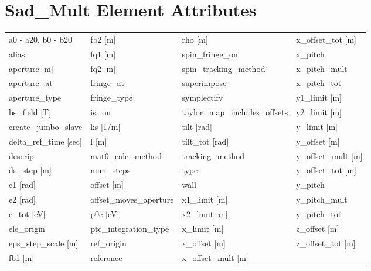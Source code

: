  \section{Sad_Mult Element Attributes}
 \label{s:list.sad.mult}
 
 \begin{tabular}{llll} \toprule
a0 - a20, b0 - b20               & fb2 [m]                          & rho [m]                          & x_offset_tot [m]                 \\
alias                            & fq1 [m]                          & spin_fringe_on                   & x_pitch                          \\
aperture [m]                     & fq2 [m]                          & spin_tracking_method             & x_pitch_mult                     \\
aperture_at                      & fringe_at                        & superimpose                      & x_pitch_tot                      \\
aperture_type                    & fringe_type                      & symplectify                      & y1_limit [m]                     \\
bs_field [T]                     & is_on                            & taylor_map_includes_offsets      & y2_limit [m]                     \\
create_jumbo_slave               & ks [1/m]                         & tilt [rad]                       & y_limit [m]                      \\
delta_ref_time [sec]             & l [m]                            & tilt_tot [rad]                   & y_offset [m]                     \\
descrip                          & mat6_calc_method                 & tracking_method                  & y_offset_mult [m]                \\
ds_step [m]                      & num_steps                        & type                             & y_offset_tot [m]                 \\
e1 [rad]                         & offset [m]                       & wall                             & y_pitch                          \\
e2 [rad]                         & offset_moves_aperture            & x1_limit [m]                     & y_pitch_mult                     \\
e_tot [eV]                       & p0c [eV]                         & x2_limit [m]                     & y_pitch_tot                      \\
ele_origin                       & ptc_integration_type             & x_limit [m]                      & z_offset [m]                     \\
eps_step_scale [m]               & ref_origin                       & x_offset [m]                     & z_offset_tot [m]                 \\
fb1 [m]                          & reference                        & x_offset_mult [m]                &                                  \\
 \bottomrule
 \end{tabular}
 \vfill
 
